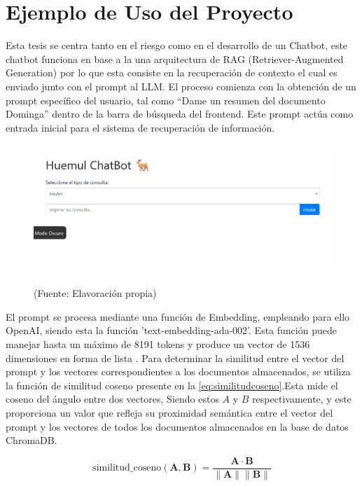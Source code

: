 \chapter{Ejemplo de Uso del Proyecto}

Esta tesis se centra tanto en el riesgo como en el desarrollo de un Chatbot, este chatbot funciona 
en base a la una arquitectura de RAG (Retriever-Augmented Generation) por lo que esta consiste en 
la recuperación de contexto el cual es enviado junto con el prompt al LLM. El proceso comienza con 
la obtención de un prompt específico del usuario, tal como ``Dame un resumen del documento Dominga'' 
dentro de la barra de búsqueda del frontend. Este prompt actúa como entrada inicial para el sistema 
de recuperación de información.

\begin{figure}[ht!]
    \centering
    \includegraphics[width=.8\textwidth]{figures/website.png}
    \caption[]{\\
    {\scriptsize (Fuente: Elavoración propia)}}
    \label{fig:chatbot1}
\end{figure}

El prompt se procesa mediante una función de Embedding, empleando para ello OpenAI, siendo esta  
la función 'text-embedding-ada-002'. Esta función puede manejar hasta un máximo de 8191 tokens y 
produce un vector de 1536 dimensiones en forma de lista \cite{openai1}. Para determinar la similitud entre el 
vector del prompt y los vectores correspondientes a los documentos almacenados, se utiliza la función 
de similitud coseno presente en la \autoref{eq:similitudcoseno}.Esta mide el coseno del ángulo entre dos vectores,
Siendo estos $A$ y $B$ respectivamente, y este proporciona un valor que refleja su proximidad semántica entre el vector
del prompt y los vectores de todos los documentos almacenados en la base de datos ChromaDB.

\begin{equation}
    \text{similitud\_coseno}(\mathbf{A}, \mathbf{B}) = \frac{\mathbf{A} \cdot \mathbf{B}}{\|\mathbf{A}\| \|\mathbf{B}\|}
    \label{eq:similitudcoseno}
\end{equation}


